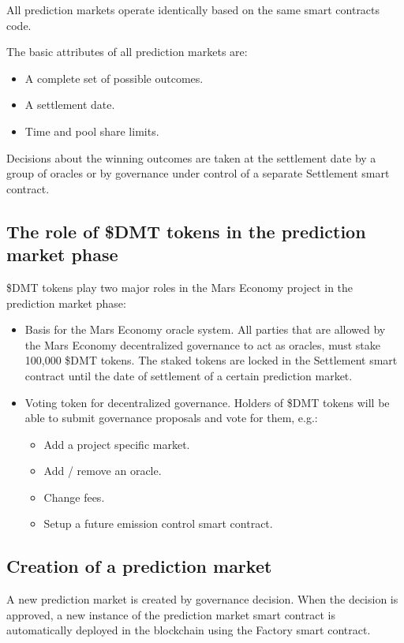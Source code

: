 \documentclass[12pt]{article}
\begin{document}
All prediction markets operate identically based on the same smart contracts code.

The basic attributes of all prediction markets are:
\begin{itemize}
\item A complete set of possible outcomes.
\item A settlement date.
\item Time and pool share limits.
\end{itemize}

Decisions about the winning outcomes are taken at the settlement date by a group of oracles or by governance under control of a separate Settlement smart contract.

\subsection{The role of \$DMT tokens in the prediction market phase}

\$DMT tokens play two major roles in the Mars Economy project in the prediction market phase:
\begin{itemize}
\item{Basis for the Mars Economy oracle system.} All parties that are allowed by the Mars Economy decentralized governance to act as oracles, must stake 100,000 \$DMT tokens. The staked tokens are locked in the Settlement smart contract until the date of settlement of a certain prediction market.
\item{Voting token for decentralized governance.} Holders of \$DMT tokens will be able to submit governance proposals and vote for them, e.g.:
	\begin{itemize}
	\item Add a project specific market.
	\item Add / remove an oracle.
	\item Change fees.
	\item Setup a future emission control smart contract.
	\end{itemize}
\end{itemize}

\subsection{Creation of a prediction market}
A new prediction market is created by governance decision. When the decision is approved, a new instance of the prediction market smart contract is automatically deployed in the blockchain using the Factory smart contract.
\end{document}
